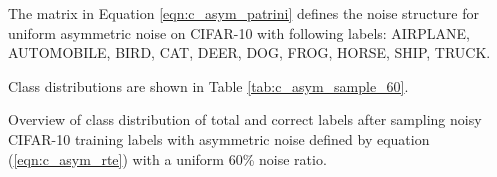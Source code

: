 \documentclass{article}
\begin{document}
The matrix  in Equation \ref{eqn:c_asym_patrini} defines the noise structure for uniform asymmetric noise on CIFAR-10 with following labels: AIRPLANE, AUTOMOBILE, BIRD, CAT, DEER, DOG, FROG, HORSE, SHIP, TRUCK.

Class distributions are shown in Table \ref{tab:c_asym_sample_60}.

\begin{table*}

\end{table*}

\label{sec:c_asym_sample_60}
\begin{table*}[h]
\renewcommand{\arraystretch}{1.3}
\centering
  \caption{Overview of class distribution of total and correct labels after sampling noisy CIFAR-10 training labels with asymmetric noise defined by equation (\ref{eqn:c_asym_rte}) with a uniform 60\% noise ratio.\newline}
  

\end{table*}
\end{document}
